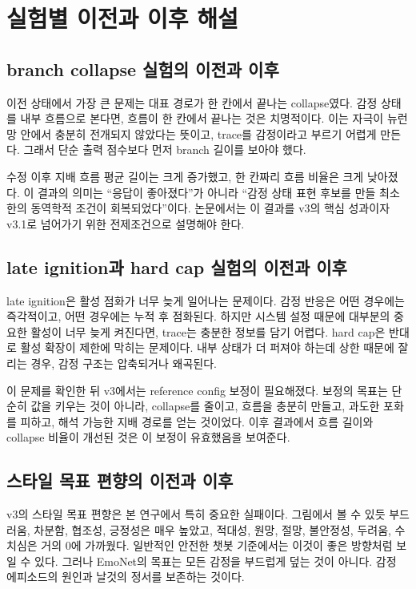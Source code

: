 \documentclass[11pt,a4paper]{article}
\begin{document}
\section{실험별 이전과 이후 해설}

\subsection{branch collapse 실험의 이전과 이후}

이전 상태에서 가장 큰 문제는 대표 경로가 한 칸에서 끝나는 collapse였다. 감정 상태를 내부 흐름으로 본다면, 흐름이 한 칸에서 끝나는 것은 치명적이다. 이는 자극이 뉴런망 안에서 충분히 전개되지 않았다는 뜻이고, trace를 감정이라고 부르기 어렵게 만든다. 그래서 단순 출력 점수보다 먼저 branch 길이를 보아야 했다.

수정 이후 지배 흐름 평균 길이는 크게 증가했고, 한 칸짜리 흐름 비율은 크게 낮아졌다. 이 결과의 의미는 ``응답이 좋아졌다''가 아니라 ``감정 상태 표현 후보를 만들 최소한의 동역학적 조건이 회복되었다''이다. 논문에서는 이 결과를 v3의 핵심 성과이자 v3.1로 넘어가기 위한 전제조건으로 설명해야 한다.

\subsection{late ignition과 hard cap 실험의 이전과 이후}

late ignition은 활성 점화가 너무 늦게 일어나는 문제이다. 감정 반응은 어떤 경우에는 즉각적이고, 어떤 경우에는 누적 후 점화된다. 하지만 시스템 설정 때문에 대부분의 중요한 활성이 너무 늦게 켜진다면, trace는 충분한 정보를 담기 어렵다. hard cap은 반대로 활성 확장이 제한에 막히는 문제이다. 내부 상태가 더 퍼져야 하는데 상한 때문에 잘리는 경우, 감정 구조는 압축되거나 왜곡된다.

이 문제를 확인한 뒤 v3에서는 reference config 보정이 필요해졌다. 보정의 목표는 단순히 값을 키우는 것이 아니라, collapse를 줄이고, 흐름을 충분히 만들고, 과도한 포화를 피하고, 해석 가능한 지배 경로를 얻는 것이었다. 이후 결과에서 흐름 길이와 collapse 비율이 개선된 것은 이 보정이 유효했음을 보여준다.

\subsection{스타일 목표 편향의 이전과 이후}

v3의 스타일 목표 편향은 본 연구에서 특히 중요한 실패이다. 그림에서 볼 수 있듯 부드러움, 차분함, 협조성, 긍정성은 매우 높았고, 적대성, 원망, 절망, 불안정성, 두려움, 수치심은 거의 0에 가까웠다. 일반적인 안전한 챗봇 기준에서는 이것이 좋은 방향처럼 보일 수 있다. 그러나 EmoNet의 목표는 모든 감정을 부드럽게 덮는 것이 아니다. 감정 에피소드의 원인과 날것의 정서를 보존하는 것이다.
\end{document}

